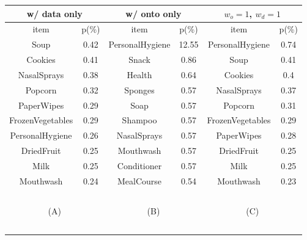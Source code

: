 \begin{table}[tbh]\scriptsize
\begin{center}
\begin{tabular}{ c c || c c || c c }
\hline
\multicolumn{2}{c||}{w/ data only}&\multicolumn{2}{c||}{w/ onto only}&\multicolumn{2}{c||}{$w_o=1$, $w_d=1$}\\
\hline
item	&	p(\%)	&	item	&	p(\%)	&	item	&	p(\%)	\\
\hline																			
Soup	&	0.42	&	PersonalHygiene	&	12.55	&	PersonalHygiene	&	0.74	\\
Cookies	&	0.41	&	Snack	&	0.86	&	Soup	&	0.41	\\
NasalSprays	&	0.38	&	Health	&	0.64	&	Cookies	&	0.4	\\
Popcorn	&	0.32	&	Sponges	&	0.57	&	NasalSprays	&	0.37	\\
PaperWipes	&	0.29	&	Soap	&	0.57	&	Popcorn	&	0.31	\\
FrozenVegetables	&	0.29	&	Shampoo	&	0.57	&	FrozenVegetables	&	0.29	 \\
PersonalHygiene	&	0.26	&	NasalSprays	&	0.57	&	PaperWipes	&	0.28	 \\
DriedFruit	&	0.25	&	Mouthwash	&	0.57	&	DriedFruit	&	0.25	 \\
Milk	&	0.25	&	Conditioner	&	0.57	&	Milk	&	0.25	\\
Mouthwash	&	0.24	&	MealCourse	&	0.54	&	Mouthwash	&	0.23	\\
\hline
\multicolumn{6}{c}{~}\\
\multicolumn{2}{c}{(A)}  &   \multicolumn{2}{c}{(B)}  &   \multicolumn{2}{c}{(C)}  \\
\multicolumn{6}{c}{~}\\
\end{tabular}


\end{center}
\end{table}
